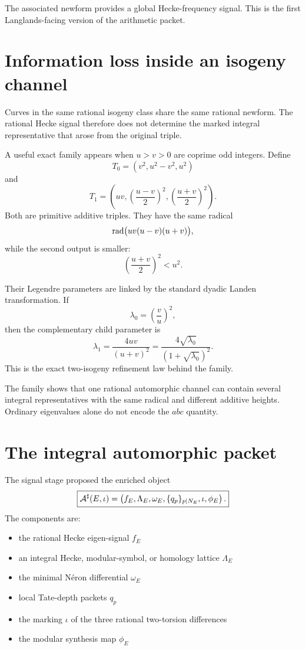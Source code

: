 The associated newform provides a global Hecke-frequency signal. This is the first Langlands-facing version of the arithmetic packet.

\section{Information loss inside an isogeny channel}
Curves in the same rational isogeny class share the same rational newform. The rational Hecke signal therefore does not determine the marked integral representative that arose from the original triple.

A useful exact family appears when $u>v>0$ are coprime odd integers. Define
\[
T_0
=
\left(v^2,u^2-v^2,u^2\right)
\]
and
\[
T_1
=
\left(
uv,
\left(\frac{u-v}{2}\right)^2,
\left(\frac{u+v}{2}\right)^2
\right).
\]
Both are primitive additive triples. They have the same radical
\[
\operatorname{rad}\bigl(uv(u-v)(u+v)\bigr),
\]
while the second output is smaller:
\[
\left(\frac{u+v}{2}\right)^2<u^2.
\]

Their Legendre parameters are linked by the standard dyadic Landen transformation. If
\[
\lambda_0=\left(\frac vu\right)^2,
\]
then the complementary child parameter is
\[
\lambda_1
=
\frac{4uv}{(u+v)^2}
=
\frac{4\sqrt{\lambda_0}}{(1+\sqrt{\lambda_0})^2}.
\]
This is the exact two-isogeny refinement law behind the family.

The family shows that one rational automorphic channel can contain several integral representatives with the same radical and different additive heights. Ordinary eigenvalues alone do not encode the $abc$ quantity.

\section{The integral automorphic packet}
The signal stage proposed the enriched object
\[
\boxed{
\mathcal A^{\sharp}(E,\iota)
=
\left(
 f_E,
 \Lambda_E,
 \omega_E,
 \{q_p\}_{p\mid N_E},
 \iota,
 \phi_E
\right).
}
\]
The components are:
\begin{itemize}[leftmargin=1.5em]
\item the rational Hecke eigen-signal $f_E$
\item an integral Hecke, modular-symbol, or homology lattice $\Lambda_E$
\item the minimal N\'eron differential $\omega_E$
\item local Tate-depth packets $q_p$
\item the marking $\iota$ of the three rational two-torsion differences
\item the modular synthesis map $\phi_E$
\end{itemize}

